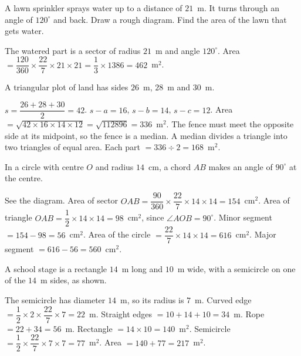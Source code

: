 \ques A lawn sprinkler sprays water up to a distance of $21$~m. It turns through an angle of $120^\circ$ and back. Draw a rough diagram. Find the area of the lawn that gets water.\par
\begin{answerblock}
The watered part is a sector of radius $21$~m and angle $120^\circ$.\nl
Area $=\dfrac{120}{360}\times\dfrac{22}{7}\times21\times21=\dfrac13\times1386=462$~m$^2$.
\end{answerblock}


\ques A triangular plot of land has sides $26$~m, $28$~m and $30$~m.\par
{}
\begin{answerblock}
 $s=\dfrac{26+28+30}{2}=42$. $s-a=16$, $s-b=14$, $s-c=12$.\nl
Area $=\sqrt{42\times16\times14\times12}=\sqrt{112896}=336$~m$^2$.
 The fence must meet the opposite side at its midpoint, so the fence is a median.\nl
A median divides a triangle into two triangles of equal area. Each part $=336\div2=168$~m$^2$.
\end{answerblock}

\ques In a circle with centre $O$ and radius $14$~cm, a chord $AB$ makes an angle of $90^\circ$ at the centre.\par
{}
\begin{answerblock}
 See the diagram.
 Area of sector $OAB=\dfrac{90}{360}\times\dfrac{22}{7}\times14\times14=154$~cm$^2$.\nl
Area of triangle $OAB=\dfrac12\times14\times14=98$~cm$^2$, since $\angle AOB=90^\circ$.\nl
Minor segment $=154-98=56$~cm$^2$.
 Area of the circle $=\dfrac{22}{7}\times14\times14=616$~cm$^2$. Major segment $=616-56=560$~cm$^2$.
\end{answerblock}

\ques A school stage is a rectangle $14$~m long and $10$~m wide, with a semicircle on one of the $14$~m sides, as shown.\par
\nopagebreak
{}
\begin{answerblock}
 The semicircle has diameter $14$~m, so its radius is $7$~m.\nl
Curved edge $=\dfrac12\times2\times\dfrac{22}{7}\times7=22$~m. Straight edges $=10+14+10=34$~m.\nl
Rope $=22+34=56$~m.
 Rectangle $=14\times10=140$~m$^2$. Semicircle $=\dfrac12\times\dfrac{22}{7}\times7\times7=77$~m$^2$.\nl
Area $=140+77=217$~m$^2$.
\end{answerblock}

